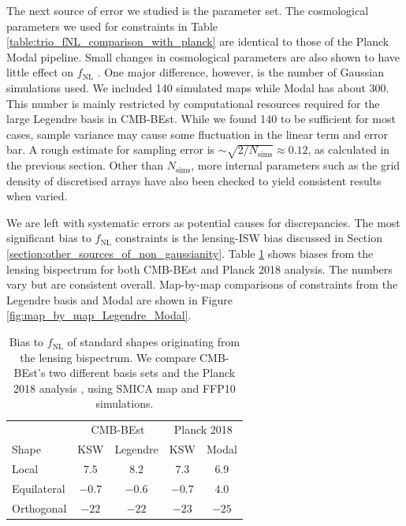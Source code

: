 The next source of error we studied is the parameter set. The cosmological parameters we used for constraints in Table \ref{table:trio_fNL_comparison_with_planck} are identical to those of the Planck Modal pipeline. Small changes in cosmological parameters are also shown to have little effect on $f_\text{NL}$ \cite{PlanckCollaboration2015,PlanckCollaboration2018}. One major difference, however, is the number of Gaussian simulations used. We included 140 simulated maps while Modal has about 300. This number is mainly restricted by computational resources required for the large Legendre basis in CMB-BEst. While we found 140 to be sufficient for most cases, sample variance may cause some fluctuation in the linear term and error bar. A rough estimate for sampling error is $\sim \sqrt{2/N_\text{sims}} \approx 0.12$, as calculated in the previous section. Other than $N_\text{sims}$, more internal parameters such as the grid density of discretised arrays have also been checked to yield consistent results when varied. 

We are left with systematic errors as potential causes for discrepancies. The most significant bias to $f_\text{NL}$ constraints is the lensing-ISW bias discussed in Section \ref{section:other_sources_of_non_gaussianity}. Table \ref{table:trio_lensing_bias_comparison_with_planck} shows biases from the lensing bispectrum \cite{Lewis2011lensing} for both CMB-BEst and Planck 2018 analysis. The numbers vary but are consistent overall. Map-by-map comparisons of constraints from the Legendre basis and Modal are shown in Figure \ref{fig:map_by_map_Legendre_Modal}. 

\begin{table}[h]
	\caption{Bias to $f_\text{NL}$ of standard shapes originating from the lensing bispectrum. We compare CMB-BEst's two different basis sets and the Planck 2018 analysis \cite{PlanckCollaboration2018}, using SMICA map and FFP10 simulations. }
	\centering
	\label{table:trio_lensing_bias_comparison_with_planck}
	\renewcommand{\arraystretch}{1.5} 
	\begin{tabular}{lcccc}
		\toprule
		& \multicolumn{2}{c}{CMB-BEst} & \multicolumn{2}{c}{Planck 2018} \\ \cmidrule(lr){2-3} \cmidrule(lr){4-5}
		Shape & KSW &  Legendre &  KSW &  Modal \\
		\midrule
		
		Local & $7.5$ & $8.2$ & $7.3$ & $6.9$ \\
		Equilateral & $-0.7$ & $-0.6$ & $-0.7$ & $4.0$\\
		Orthogonal & $-22$ & $-22$ & $-23$ & $-25$ \\
		\bottomrule
	\end{tabular}
\end{table}

